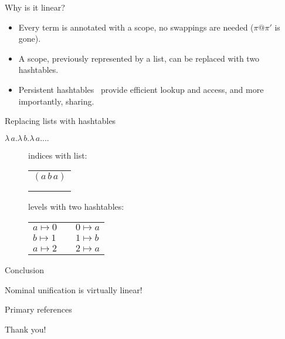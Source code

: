 \documentclass[pdf]{beamer}
\begin{document}
\begin{frame}{Why is it linear?}
  
  \begin{itemize}
  \item Every term is annotated with a scope, no swappings are needed
    ($\pi@\pi'$ is gone).
  
  \item A scope, previously represented by a list,
    can be replaced with two hashtables.
    
  \item Persistent hashtables~\citep{bagwell_ideal_2001} provide
    efficient lookup and access, and more importantly, sharing.
  \end{itemize}
\end{frame}

\begin{frame}{Replacing lists with hashtables}

  {\centering
    $\lambda\,a.\lambda\,b.\lambda\,a. ...$
  \par}
  \begin{figure}[H]
  \centering
  \begin{minipage}{0.45\textwidth}
    \centering
    indices with list: \\
    \begin{tabular}{l}
      $(a\,b\,a)$ \\
      \\ \\
      \end{tabular}
  \end{minipage}\hfill
    \begin{minipage}{0.45\textwidth}
    \centering
    levels with two hashtables:
    \begin{tabular}{l l l}
      $a \mapsto 0$ & & $0 \mapsto a$ \\
      $b \mapsto 1$ & & $1 \mapsto b$ \\
      $a \mapsto 2$ & & $2 \mapsto a$ \\
    \end{tabular}
    \end{minipage}
  \end{figure}

\end{frame}

\begin{frame}{Conclusion}
  
  {\centering
    \Huge Nominal unification is virtually linear!
    \par}
\end{frame}
 
\begin{frame}{Primary references}


\end{frame}

\begin{frame}
  \begin{center}
    \Huge Thank you!
   \end{center}
\end{frame}
  
\end{document}
